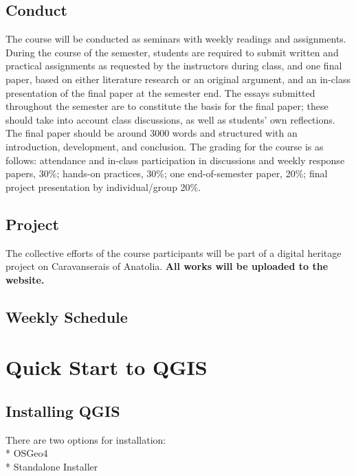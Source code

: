 \documentclass[
]{book}
\begin{document}
\hypertarget{conduct}{%
\section{Conduct}\label{conduct}}

The course will be conducted as seminars with weekly readings and assignments. During the course of the semester, students are required to submit written and practical assignments as requested by the instructors during class, and one final paper, based on either literature research or an original argument, and an in-class presentation of the final paper at the semester end. The essays submitted throughout the semester are to constitute the basis for the final paper; these should take into account class discussions, as well as students' own reflections. The final paper should be around 3000 words and structured with an introduction, development, and conclusion. The grading for the course is as follows: attendance and in-class participation in discussions and weekly response papers, 30\%; hands-on practices, 30\%; one end-of-semester paper, 20\%; final project presentation by individual/group 20\%.

\hypertarget{project}{%
\section{Project}\label{project}}

The collective efforts of the course participants will be part of a digital heritage project on Caravanserais of Anatolia. \textbf{All works will be uploaded to the website.}

\hypertarget{weekly-schedule}{%
\section{Weekly Schedule}\label{weekly-schedule}}

\hypertarget{quick-start-to-qgis}{%
\chapter{Quick Start to QGIS}\label{quick-start-to-qgis}}

\hypertarget{installing-qgis}{%
\section{Installing QGIS}\label{installing-qgis}}

There are two options for installation:\\
* OSGeo4\\
* Standalone Installer
\end{document}

